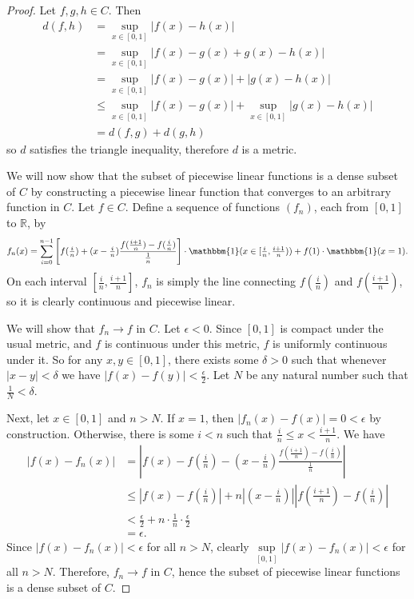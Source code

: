 \documentclass[10pt]{article}
\newcommand{\R}{\mathbb{R}}
\begin{document}
\begin{enumerate}
\begin{proof}
Let $f,g,h \in C$.  Then
\begin{align*}
d(f,h) &= \sup\limits_{x \in [0,1]} |f(x) - h(x)| \\
&= \sup\limits_{x \in [0,1]} |f(x) - g(x) + g(x) - h(x)| \\
&= \sup\limits_{x \in [0,1]} |f(x) - g(x)| + |g(x) - h(x)| \\
&\leq \sup\limits_{x \in [0,1]} |f(x) - g(x)| + \sup\limits_{x \in [0,1]} |g(x) - h(x)| \\
&= d(f,g) + d(g,h)
\end{align*}
so $d$ satisfies the triangle inequality, therefore $d$ is a metric.

We will now show that the subset of piecewise linear functions is a dense subset of $C$ by constructing a piecewise linear function that converges to an arbitrary function in $C$.  Let $f \in C$.  Define a sequence of functions $(f_n)$, each from $[0,1]$ to $\R$, by
$$
f_n(x) = \sum_{i = 0}^{n-1} \left[ f( \tfrac{i}{n}) + (x - \tfrac{i}{n})\frac{f(\tfrac{i+1}{n}) - f(\tfrac{i}{n})}{\tfrac{1}{n}}  \right] \cdot \mathbbm{1}(x \in [\tfrac{i}{n}, \tfrac{i+1}{n})) + f(1) \cdot \mathbbm{1}(x = 1).
$$
On each interval $\left[\frac{i}{n}, \frac{i+1}{n}\right]$, $f_n$ is simply the line connecting $f(\frac{i}{n})$ and $f(\frac{i+1}{n})$, so it is clearly continuous and piecewise linear.

We will show that $f_n \rightarrow f$ in $C$.  Let $\epsilon < 0$.  Since $[0,1]$ is compact under the usual metric, and $f$ is continuous under this metric, $f$ is uniformly continuous under it.  So for any $x,y \in [0,1]$, there exists some $\delta > 0$ such that whenever $|x-y| < \delta$ we have $|f(x) - f(y)| < \frac{\epsilon}{2}$.  Let $N$ be any natural number such that $\frac{1}{N} < \delta$.

Next, let $x \in [0,1]$ and $n > N$.  If $x = 1$, then $|f_n(x) - f(x)| = 0 < \epsilon$ by construction.  Otherwise, there is some $i < n$ such that $\frac{i}{n} \leq x < \frac{i+1}{n}$.  We have
\begin{align*}
|f(x) - f_n(x)| &= \left| f(x) - f( \tfrac{i}{n}) - (x - \tfrac{i}{n})\frac{f(\tfrac{i+1}{n}) - f(\tfrac{i}{n})}{\tfrac{1}{n}} \right|
\\
&\leq \left| f(x) - f( \tfrac{i}{n}) \right| + n \left| (x - \tfrac{i}{n})\right| \left| f(\tfrac{i+1}{n}) - f(\tfrac{i}{n}) \right|
\\
&< \frac{\epsilon}{2} + n \cdot \frac{1}{n} \cdot \frac{\epsilon}{2}
\\
&= \epsilon.
\end{align*}
Since $|f(x) - f_n(x)| < \epsilon$ for all $n > N$, clearly $\sup\limits_{[0,1]} |f(x) - f_n(x)| < \epsilon$ for all $n > N$.  Therefore, $f_n \rightarrow f$ in $C$, hence the subset of piecewise linear functions is a dense subset of $C$.
\end{proof}


\end{enumerate}
\end{document}
